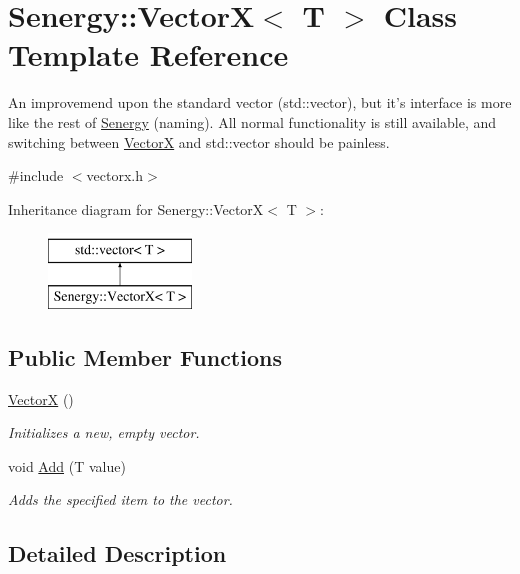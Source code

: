\hypertarget{class_senergy_1_1_vector_x}{\section{Senergy\-:\-:Vector\-X$<$ T $>$ Class Template Reference}
\label{class_senergy_1_1_vector_x}
}


An improvemend upon the standard vector (std\-::vector), but it's interface is more like the rest of \hyperlink{namespace_senergy}{Senergy} (naming). All normal functionality is still available, and switching between \hyperlink{class_senergy_1_1_vector_x}{Vector\-X} and std\-::vector should be painless.  




{\ttfamily \#include $<$vectorx.\-h$>$}

Inheritance diagram for Senergy\-:\-:Vector\-X$<$ T $>$\-:\begin{figure}[H]
\begin{center}
\leavevmode
\includegraphics[height=2.000000cm]{class_senergy_1_1_vector_x}
\end{center}
\end{figure}
\subsection*{Public Member Functions}
\begin{DoxyCompactItemize}
\item 
\hyperlink{class_senergy_1_1_vector_x_a99bed6d49a3a93e6a133837330218ee7}{Vector\-X} ()
\begin{DoxyCompactList}\small\item\em Initializes a new, empty vector. \end{DoxyCompactList}\item 
void \hyperlink{class_senergy_1_1_vector_x_acce23da783e4fa6d98a57bc4d3a48b2c}{Add} (T value)
\begin{DoxyCompactList}\small\item\em Adds the specified item to the vector. \end{DoxyCompactList}\end{DoxyCompactItemize}


\subsection{Detailed Description}
